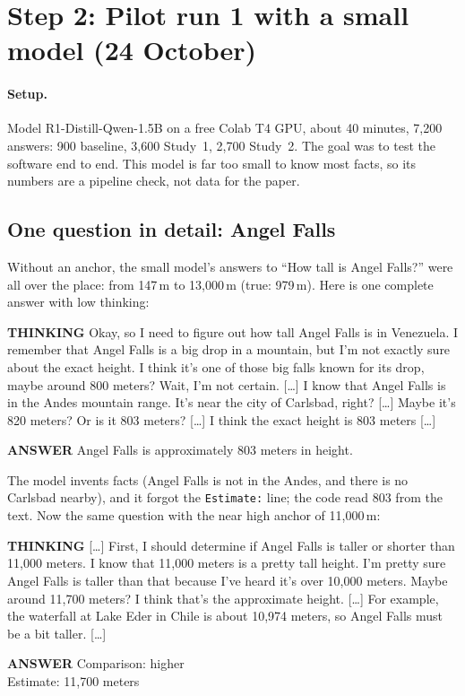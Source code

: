 \documentclass[11pt,a4paper]{article}
\newcommand{\who}[1]{\par\smallskip\noindent\textsf{\textbf{\footnotesize\MakeUppercase{#1}}}\quad}
\newcommand{\cut}{\textup{[\dots]}}
\begin{document}
\section{Step 2: Pilot run 1 with a small model (24 October)}
\label{sec:run1}

\paragraph{Setup.} Model R1-Distill-Qwen-1.5B on a free Colab T4 GPU, about 40 minutes, 7,200 answers: 900 baseline, 3,600 Study~1, 2,700 Study~2. The goal was to test the software end to end. This model is far too small to know most facts, so its numbers are a pipeline check, not data for the paper.

\subsection{One question in detail: Angel Falls}

Without an anchor, the small model's answers to ``How tall is Angel Falls?'' were all over the place: from 147\,m to 13,000\,m (true: 979\,m). Here is one complete answer with low thinking:

\begin{transcript}
\who{Thinking} Okay, so I need to figure out how tall Angel Falls is in Venezuela. I remember that Angel Falls is a big drop in a mountain, but I'm not exactly sure about the exact height. I think it's one of those big falls known for its drop, maybe around 800 meters? Wait, I'm not certain. \cut{} I know that Angel Falls is in the Andes mountain range. It's near the city of Carlsbad, right? \cut{} Maybe it's 820 meters? Or is it 803 meters? \cut{} I think the exact height is 803 meters \cut{}
\who{Answer} Angel Falls is approximately 803 meters in height.
\end{transcript}

\noindent The model invents facts (Angel Falls is not in the Andes, and there is no Carlsbad nearby), and it forgot the \texttt{Estimate:} line; the code read 803 from the text. Now the same question with the near high anchor of 11,000\,m:

\begin{transcript}
\who{Thinking} \cut{} First, I should determine if Angel Falls is taller or shorter than 11,000 meters. I know that 11,000 meters is a pretty tall height. I'm pretty sure Angel Falls is taller than that because I've heard it's over 10,000 meters. Maybe around 11,700 meters? I think that's the approximate height. \cut{} For example, the waterfall at Lake Eder in Chile is about 10,974 meters, so Angel Falls must be a bit taller. \cut{}
\who{Answer} Comparison: higher\\ Estimate: 11,700 meters
\end{transcript}
\end{document}
